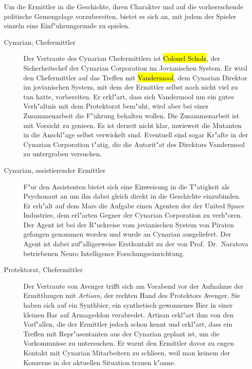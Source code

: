 
Um die Ermittler in die Geschichte, ihren Charakter und auf die vorherrschende politische Gemengelage vorzubereiten, bietet es sich an, mit jedem der Spieler einzeln eine Einf"uhrungsrunde zu spielen.

\begin{description}
	\item [Cynarian, Chefermittler] Der Vertraute des Cynarian Chefermittlers ist \hl{Colonel Scholz}, der Sicherheitschef der Cynarian 
		Corporation im Jovianischen System. Er wird den Chefermittler auf das Treffen mit \hl{Vandermool}, dem Cynarian Direktor im jovianischen System, mit dem der Ermittler selbst noch nicht viel zu tun hatte, vorbereiten. Er erkl"art, dass sich Vandermool um ein gutes Verh"altnis mit dem Protektorat bem"uht, wird aber bei einer Zusammenarbeit die F"uhrung behalten wollen. Die Zusammenarbeit ist mit Vorsicht zu genie\3en. Es ist derzeit nicht klar, inwieweit die Mutanten in die Anschl"age selbst verwickelt sind. Eventuell sind sogar Kr"afte in der Cynarian Corporation t"atig, die die Autorit"at des Direktors Vandermool zu untergraben versuchen.
	\item [Cynarian, assistierender Ermittler] F"ur den Assistenten bietet sich eine Einweisung in die T"atigkeit als Psychonaut an um 
		ihn dabei gleich direkt in die Geschichte einzubinden. Er erh"alt auf dem Mars die Aufgabe einen Agenten der der United Space Industries, dem erl"arten Gegner der Cynarian Corporation zu verh"oren. Der Agent ist bei der R"uckreise vom jovianischen System von Piraten gefangen genommen worden und wurde an Cynarian ausgeliefert. Der Agent ist dabei zuf"alligerweise Erstkontakt zu der von Prof.~Dr.~Naratova betriebenen Neuro Intelligence Forschungseinrichtung.
	\item [Protektorat, Chefermittler] Der Vertraute von Avenger trifft sich am Vorabend vor der Aufnahme der Ermittlungen mit 
		\emph{Artisan}, der rechten Hand des Protektors Avenger. Sie haben sich auf ein Synthbier, ein synthetisch gewonnenes Bier in einer kleinen Bar auf Armageddon verabredet. Artisan erkl"art ihm von den Vorf"allen, die der Ermittler jedoch schon kennt und erkl"art, dass ein Treffen mit Repr"asentanten aus der Cynarian geplant ist, um die Vorkommnisse zu untersuchen. Er warnt den Ermittler davor zu engen Kontakt mit Cynarian Mitarbeitern zu schlie\3en, weil man keinem der Konzerne in der aktuellen Situation trauen k"onne.

\end{description}
